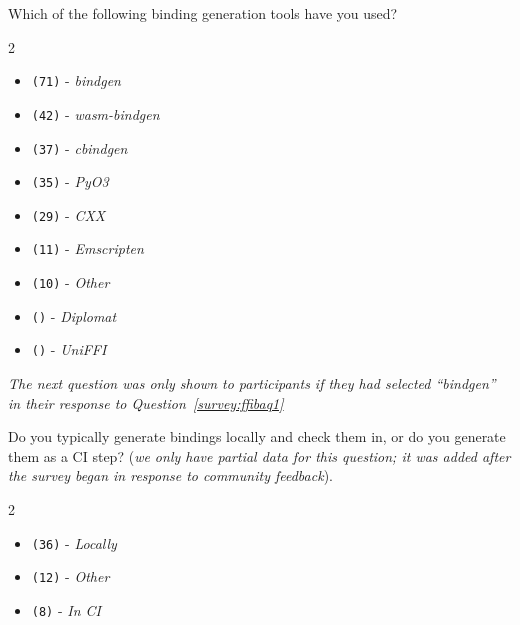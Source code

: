 \begin{protocol}
\item \label{survey:ffibaq1}  Which of the following binding generation tools have you used?
\begin{multicols}{2}
\begin{itemize}
\item \texttt{(71)} - \textit{bindgen}
\item \texttt{(42)} - \textit{wasm-bindgen}
\item \texttt{(37)} - \textit{cbindgen}
\item \texttt{(35)} - \textit{PyO3}
\item \texttt{(29)} - \textit{CXX}
\item \texttt{(11)} - \textit{Emscripten}
\item \texttt{(10)} - \textit{Other}
\item \texttt{()} - \textit{Diplomat}
\item \texttt{()} - \textit{UniFFI}
\end{itemize}
\end{multicols}
\end{protocol}

\noindent \textit{The next question was only shown to participants if they had selected ``\textit{bindgen}'' in their response to Question~\ref{survey:ffibaq1}}
\begin{protocol}
\setcounter{protocoli}{1}
\item \label{survey:ffibaq2}  Do you typically generate bindings locally and check them in, or do you generate them as a CI step? (\textit{we only have partial data for this question; it was added after the survey began in response to community feedback}).
\begin{multicols}{2}
\begin{itemize}
\item \texttt{(36)} - \textit{Locally}
\item \texttt{(12)} - \textit{Other}
\item \texttt{(8)} - \textit{In CI}
\end{itemize}
\end{multicols}
\end{protocol}

